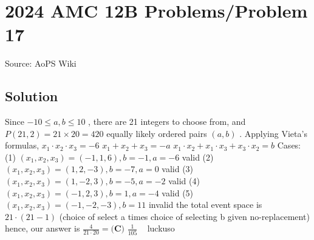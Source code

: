 \documentclass[12pt]{article}
\begin{document}
\section*{{2024 AMC 12B Problems/Problem 17}}
Source: AoPS Wiki

\subsection*{Solution}
Since $-10 \le a,b \le 10$ , there are 21 integers to choose from, and $P(21,2) = 21 \times 20 = 420$ equally likely ordered pairs $(a,b)$ . Applying Vieta's formulas, $x_1 \cdot x_2 \cdot x_3 = -6$ $x_1 + x_2+ x_3 = -a$ $x_1 \cdot x_2 + x_1 \cdot x_3 + x_3 \cdot x_2 = b$ Cases: (1) $(x_1,x_2,x_3) = (-1,1,6) , b = -1, a=-6$ valid (2) $(x_1,x_2,x_3) = ( 1,2,-3) , b = -7, a=0$ valid (3) $(x_1,x_2,x_3) = (1,-2,3) , b = -5, a=-2$ valid (4) $(x_1,x_2,x_3) = (-1,2,3) , b = 1, a=-4$ valid (5) $(x_1,x_2,x_3) = (-1,-2,-3) , b = 11$ invalid the total event space is $21 \cdot (21- 1)$ (choice of select a times choice of selecting b given no-replacement) hence, our answer is $\frac{4}{21 \cdot 20} = \boxed{\textbf{(C) }\frac{1}{105}}$ ~ luckuso
\end{document}
